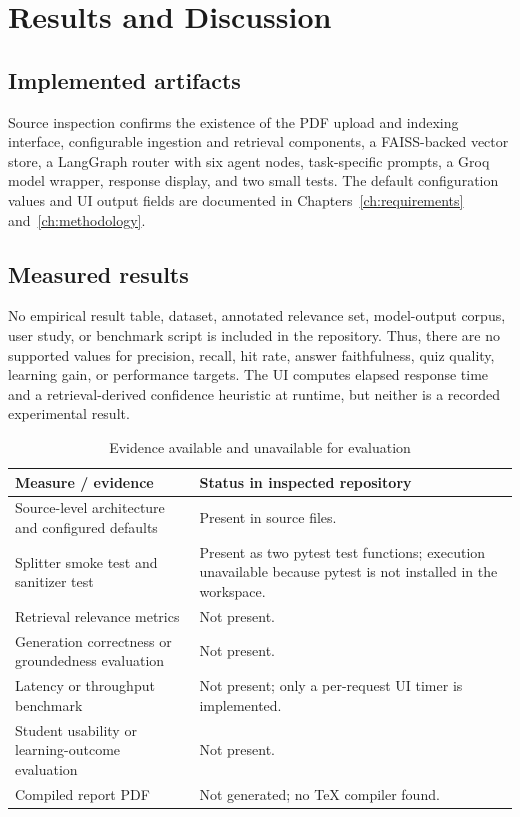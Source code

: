 \chapter{Results and Discussion}
\label{ch:results}

\section{Implemented artifacts}
Source inspection confirms the existence of the PDF upload and indexing interface, configurable ingestion and retrieval components, a FAISS-backed vector store, a LangGraph router with six agent nodes, task-specific prompts, a Groq model wrapper, response display, and two small tests. The default configuration values and UI output fields are documented in Chapters~\ref{ch:requirements} and~\ref{ch:methodology}.

\section{Measured results}
No empirical result table, dataset, annotated relevance set, model-output corpus, user study, or benchmark script is included in the repository. Thus, there are no supported values for precision, recall, hit rate, answer faithfulness, quiz quality, learning gain, or performance targets. The UI computes elapsed response time and a retrieval-derived confidence heuristic at runtime, but neither is a recorded experimental result.

\begin{table}[htbp]
\centering
\caption{Evidence available and unavailable for evaluation}
\label{tab:evidence}
\begin{tabularx}{\textwidth}{p{}Y}
\toprule
\textbf{Measure / evidence} & \textbf{Status in inspected repository}\\
\midrule
Source-level architecture and configured defaults & Present in source files.\\
Splitter smoke test and sanitizer test & Present as two pytest test functions; execution unavailable because pytest is not installed in the workspace.\\
Retrieval relevance metrics & Not present.\\
Generation correctness or groundedness evaluation & Not present.\\
Latency or throughput benchmark & Not present; only a per-request UI timer is implemented.\\
Student usability or learning-outcome evaluation & Not present.\\
Compiled report PDF & Not generated; no TeX compiler found.\\
\bottomrule
\end{tabularx}
\end{table}

